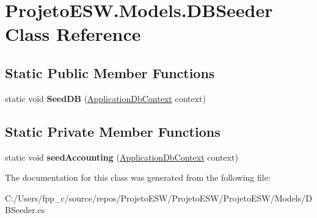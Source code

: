 \hypertarget{class_projeto_e_s_w_1_1_models_1_1_d_b_seeder}{}\section{Projeto\+E\+S\+W.\+Models.\+D\+B\+Seeder Class Reference}
\label{class_projeto_e_s_w_1_1_models_1_1_d_b_seeder}
\subsection*{Static Public Member Functions}
\begin{DoxyCompactItemize}
\item 
\mbox{\label{class_projeto_e_s_w_1_1_models_1_1_d_b_seeder_aa250b713fc107fb012a5699d3f3cb462}} 
static void {\bfseries Seed\+DB} (\mbox{\hyperlink{class_projeto_e_s_w_1_1_data_1_1_application_db_context}{Application\+Db\+Context}} context)
\end{DoxyCompactItemize}
\subsection*{Static Private Member Functions}
\begin{DoxyCompactItemize}
\item 
\mbox{\label{class_projeto_e_s_w_1_1_models_1_1_d_b_seeder_a978200be3b55bf9f503f9edff2ed2807}} 
static void {\bfseries seed\+Accounting} (\mbox{\hyperlink{class_projeto_e_s_w_1_1_data_1_1_application_db_context}{Application\+Db\+Context}} context)
\end{DoxyCompactItemize}


The documentation for this class was generated from the following file\+:\begin{DoxyCompactItemize}
\item 
C\+:/\+Users/fpp\+\_\+c/source/repos/\+Projeto\+E\+S\+W/\+Projeto\+E\+S\+W/\+Projeto\+E\+S\+W/\+Models/D\+B\+Seeder.\+cs\end{DoxyCompactItemize}
